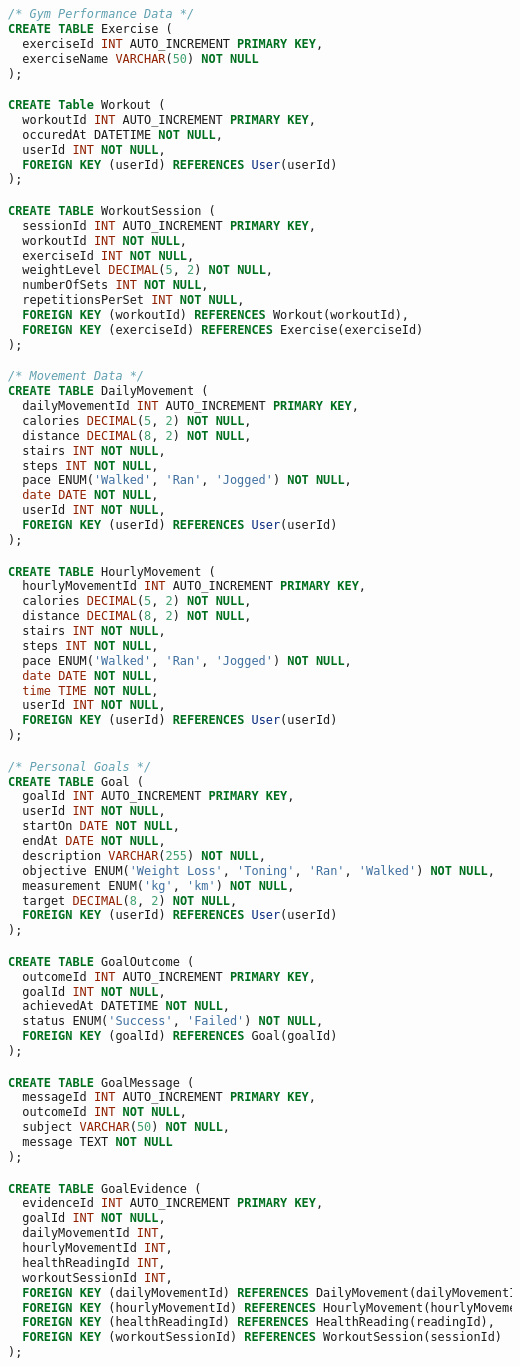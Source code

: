 \documentclass{article}
\begin{document}
\begin{lstlisting}[language=sql]
/* Gym Performance Data */
CREATE TABLE Exercise (
  exerciseId INT AUTO_INCREMENT PRIMARY KEY,
  exerciseName VARCHAR(50) NOT NULL
);

CREATE Table Workout (
  workoutId INT AUTO_INCREMENT PRIMARY KEY,
  occuredAt DATETIME NOT NULL,
  userId INT NOT NULL,
  FOREIGN KEY (userId) REFERENCES User(userId)
);

CREATE TABLE WorkoutSession (
  sessionId INT AUTO_INCREMENT PRIMARY KEY,
  workoutId INT NOT NULL,
  exerciseId INT NOT NULL,
  weightLevel DECIMAL(5, 2) NOT NULL,
  numberOfSets INT NOT NULL,
  repetitionsPerSet INT NOT NULL,
  FOREIGN KEY (workoutId) REFERENCES Workout(workoutId),
  FOREIGN KEY (exerciseId) REFERENCES Exercise(exerciseId)
);

/* Movement Data */
CREATE TABLE DailyMovement (
  dailyMovementId INT AUTO_INCREMENT PRIMARY KEY,
  calories DECIMAL(5, 2) NOT NULL,
  distance DECIMAL(8, 2) NOT NULL,
  stairs INT NOT NULL,
  steps INT NOT NULL,
  pace ENUM('Walked', 'Ran', 'Jogged') NOT NULL,
  date DATE NOT NULL,
  userId INT NOT NULL,
  FOREIGN KEY (userId) REFERENCES User(userId)
);

CREATE TABLE HourlyMovement (
  hourlyMovementId INT AUTO_INCREMENT PRIMARY KEY,
  calories DECIMAL(5, 2) NOT NULL,
  distance DECIMAL(8, 2) NOT NULL,
  stairs INT NOT NULL,
  steps INT NOT NULL,
  pace ENUM('Walked', 'Ran', 'Jogged') NOT NULL,
  date DATE NOT NULL,
  time TIME NOT NULL,
  userId INT NOT NULL,
  FOREIGN KEY (userId) REFERENCES User(userId)
);

/* Personal Goals */
CREATE TABLE Goal (
  goalId INT AUTO_INCREMENT PRIMARY KEY,
  userId INT NOT NULL,
  startOn DATE NOT NULL,
  endAt DATE NOT NULL,
  description VARCHAR(255) NOT NULL,
  objective ENUM('Weight Loss', 'Toning', 'Ran', 'Walked') NOT NULL,
  measurement ENUM('kg', 'km') NOT NULL,
  target DECIMAL(8, 2) NOT NULL,
  FOREIGN KEY (userId) REFERENCES User(userId)
);

CREATE TABLE GoalOutcome (
  outcomeId INT AUTO_INCREMENT PRIMARY KEY,
  goalId INT NOT NULL,
  achievedAt DATETIME NOT NULL,
  status ENUM('Success', 'Failed') NOT NULL,
  FOREIGN KEY (goalId) REFERENCES Goal(goalId)
);

CREATE TABLE GoalMessage (
  messageId INT AUTO_INCREMENT PRIMARY KEY,
  outcomeId INT NOT NULL,
  subject VARCHAR(50) NOT NULL,
  message TEXT NOT NULL
);

CREATE TABLE GoalEvidence (
  evidenceId INT AUTO_INCREMENT PRIMARY KEY,
  goalId INT NOT NULL,
  dailyMovementId INT,
  hourlyMovementId INT,
  healthReadingId INT,
  workoutSessionId INT,
  FOREIGN KEY (dailyMovementId) REFERENCES DailyMovement(dailyMovementId),
  FOREIGN KEY (hourlyMovementId) REFERENCES HourlyMovement(hourlyMovementId),
  FOREIGN KEY (healthReadingId) REFERENCES HealthReading(readingId),
  FOREIGN KEY (workoutSessionId) REFERENCES WorkoutSession(sessionId)
);
\end{lstlisting}
\end{document}
